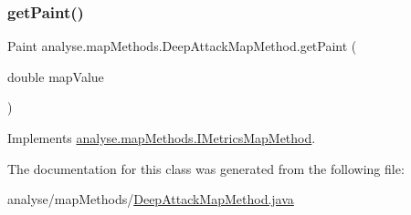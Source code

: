 \subsubsection{\texorpdfstring{get\+Paint()}{getPaint()}}
{\footnotesize\ttfamily Paint analyse.\+map\+Methods.\+Deep\+Attack\+Map\+Method.\+get\+Paint (\begin{DoxyParamCaption}\item[{double}]{map\+Value }\end{DoxyParamCaption})\hspace{0.3cm}{\ttfamily [inline]}}



Implements \mbox{\hyperlink{interfaceanalyse_1_1map_methods_1_1_i_metrics_map_method_a102909023c32cebe3bc75052f55b24a0}{analyse.\+map\+Methods.\+I\+Metrics\+Map\+Method}}.



The documentation for this class was generated from the following file\+:\begin{DoxyCompactItemize}
\item 
analyse/map\+Methods/\mbox{\hyperlink{_deep_attack_map_method_8java}{Deep\+Attack\+Map\+Method.\+java}}\end{DoxyCompactItemize}

